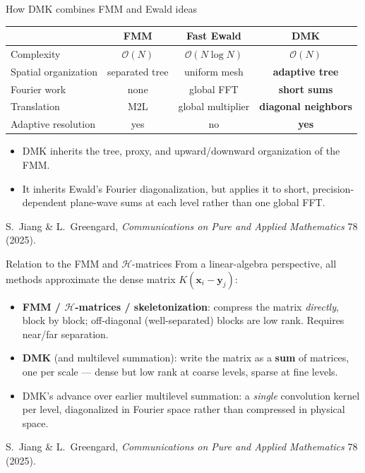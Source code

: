 \documentclass[aspectratio=169,11pt]{beamer}
\newcommand{\cO}{\mathcal{O}}
\newcommand{\x}{\bm{x}}
\newcommand{\y}{\bm{y}}
\newcommand{\hl}[1]{{\color{CCMorange}\textbf{#1}}}
\newcommand{\gray}[1]{{\color{mygray}#1}}
\begin{document}
\begin{frame}{How DMK combines FMM and Ewald ideas}
\small
\begin{center}
\begin{tabular}{@{}lccc@{}}
\toprule
 & FMM & Fast Ewald & \hl{DMK}\\
\midrule
Complexity & \(\cO(N)\) & \(\cO(N\log N)\) & \(\cO(N)\)\\
Spatial organization & separated tree & uniform mesh & \hl{adaptive tree}\\
Fourier work & none & global FFT & \hl{short sums}\\
Translation & M2L & global multiplier & \hl{diagonal neighbors}\\
Adaptive resolution & yes & no & \hl{yes}\\
\bottomrule
\end{tabular}
\end{center}
\vspace{2mm}
\begin{itemize}
  \item DMK inherits the tree, proxy, and upward/downward organization of the FMM.
  \item It inherits Ewald's Fourier diagonalization, but applies it to short, precision-dependent plane-wave sums at each level rather than one global FFT.
\end{itemize}
{\scriptsize\gray{S.\ Jiang \& L.\ Greengard, \emph{Communications on Pure and Applied Mathematics} 78 (2025).}}
\end{frame}

\begin{frame}{Relation to the FMM and \(\mathcal H\)-matrices}
\small
From a linear-algebra perspective, all methods approximate the dense matrix \(K(\x_i-\y_j)\):
\begin{itemize}
  \item \hl{FMM / \(\mathcal H\)-matrices / skeletonization}: compress the matrix \emph{directly}, block by block; off-diagonal (well-separated) blocks are low rank. Requires near/far separation.
  \item \hl{DMK} (and multilevel summation): write the matrix as a \hl{sum} of matrices, one per scale --- dense but low rank at coarse levels, sparse at fine levels.
  \item DMK's advance over earlier multilevel summation: a \emph{single} convolution kernel per level, diagonalized in Fourier space rather than compressed in physical space.
\end{itemize}
{\scriptsize\gray{S.\ Jiang \& L.\ Greengard, \emph{Communications on Pure and Applied Mathematics} 78 (2025).}}
\end{frame}
\end{document}
